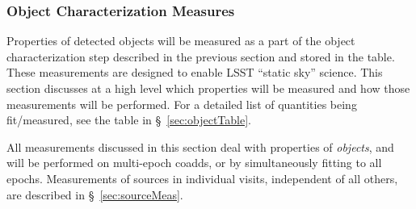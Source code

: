 \documentclass[SE,lsstdraft,toc]{lsstdoc}
\begin{document}
\subsubsection{Object Characterization Measures}
\label{sec:objchar}

Properties of detected objects will be measured as a part of the object characterization step described in the previous section and stored in the \Object table. These measurements are designed to enable LSST ``static sky'' science. This section discusses at a high level which properties will be measured and how those measurements will be performed. For a detailed list of quantities being fit/measured, see the table in \S~\ref{sec:objectTable}.

All measurements discussed in this section deal with properties of \emph{objects}, and will be performed on multi-epoch coadds, or by simultaneously fitting to all epochs. Measurements of sources in individual visits, independent of all others, are described in \S~\ref{sec:sourceMeas}.

\vspace{1em}
\end{document}
